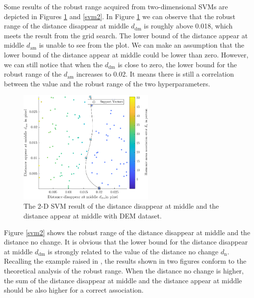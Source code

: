 Some results of the robust range acquired from two-dimensional SVMs are depicted in Figures \ref{svm1} and \ref{svm2}. In Figure \ref{svm1} we can observe that the robust range of the distance disappear at middle $d_{\mathrm{dm}}$ is roughly above 0.018, which meets the result from the grid search. The lower bound of the distance appear at middle $d_{\mathrm{am}}$ is unable to see from the plot. We can make an assumption that the lower bound of the distance appear at middle could be lower than zero. However, we can still notice that when the $d_{\mathrm{dm}}$ is close to zero, the lower bound for the robust range of the $d_{\mathrm{am}}$ increases to 0.02. It means there is still a correlation between the value and the robust range of the two hyperparameters.

\begin{figure}[htb]
\centering
\includegraphics[width=0.6\textwidth]{figures/Asso/overfitting2.png}
\caption{The 2-D SVM result of the distance disappear at middle and the distance appear at middle with DEM dataset.}
\label{svm1}
\end{figure}

Figure \ref{svm2} shows the robust range of the distance disappear at middle and the distance no change. It is obvious that the lower bound for the distance disappear at middle $d_{\mathrm{dm}}$ is strongly related to the value of the distance no change $d_{\mathrm{n}}$. Recalling the example raised in , the results shown in two figures conform to the theoretical analysis of the robust range. When the distance no change is higher, the sum of the distance disappear at middle and the distance appear at middle should be also higher for a correct association.

